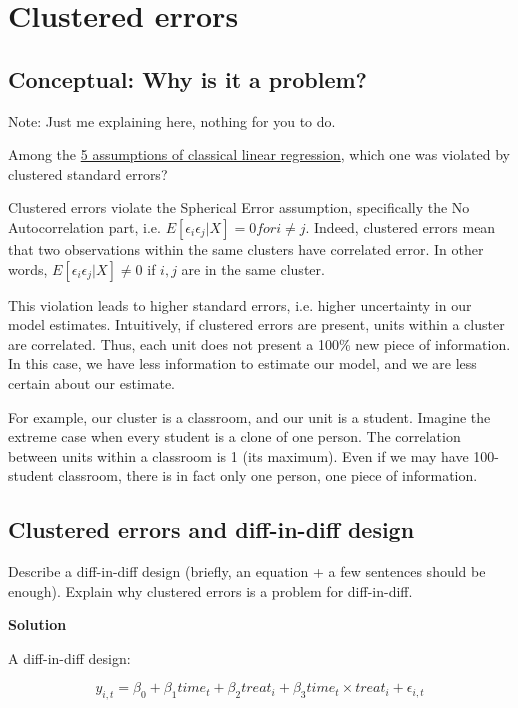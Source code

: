 \documentclass{article}\usepackage[]{graphicx}\usepackage[]{color}
\begin{document}
\section{Clustered errors}

\subsection{Conceptual: Why is it a problem?}

Note: Just me explaining here, nothing for you to do.

Among the \href{https://en.wikipedia.org/wiki/Ordinary_least_squares#Assumptions}{5 assumptions of classical linear regression}, which one was violated by clustered standard errors?

Clustered errors violate the Spherical Error assumption, specifically the No Autocorrelation part, i.e. $E[\epsilon_i\epsilon_j|X] = 0 for i \neq j$. Indeed, clustered errors mean that two observations within the same clusters have correlated error. In other words, $E[\epsilon_i\epsilon_j|X] \neq 0$ if $i, j$ are in the same cluster.

This violation leads to higher standard errors, i.e. higher uncertainty in our model estimates. Intuitively, if clustered errors are present, units within a cluster are correlated. Thus, each unit does not present a 100\% new piece of information. In this case, we have less information to estimate our model, and we are less certain about our estimate.

For example, our cluster is a classroom, and our unit is a student. Imagine the extreme case when every student is a clone of one person. The correlation between units within a classroom is 1 (its maximum). Even if we may have 100-student classroom, there is in fact only one person, one piece of information.

\subsection{Clustered errors and diff-in-diff design}

Describe a diff-in-diff design (briefly, an equation + a few sentences should be enough). Explain why clustered errors is a problem for diff-in-diff.

\textbf{Solution}

A diff-in-diff design:

$$
y_{i, t} = \beta_0 + \beta_1 time_t + \beta_2 treat_i + \beta_3 time_t \times treat_i + \epsilon_{i, t}
$$
\end{document}

